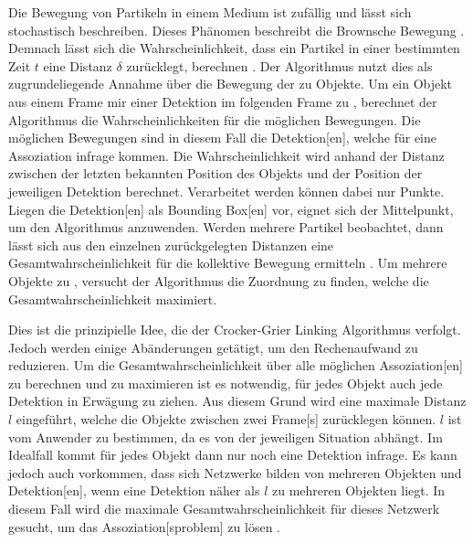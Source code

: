 Die Bewegung von Partikeln in einem Medium ist zufällig und lässt sich stochastisch beschreiben. Dieses Phänomen beschreibt die \gls{Brownsche Bewegung} \cite{Nelson.1972}. Demnach lässt sich die Wahrscheinlichkeit, dass ein Partikel in einer bestimmten Zeit \(t\) eine Distanz \(\delta\) zurücklegt, berechnen \cite{Crocker.1996}. Der Algorithmus nutzt dies als zugrundeliegende Annahme über die Bewegung der zu  Objekte. Um ein Objekt aus einem \gls{Frame} mir einer \gls{Detektion} im folgenden \gls{Frame} zu , berechnet der Algorithmus die Wahrscheinlichkeiten für die möglichen Bewegungen. Die möglichen Bewegungen sind in diesem Fall die \gls{Detektion}[en], welche für eine \gls{Assoziation} infrage kommen. Die Wahrscheinlichkeit wird anhand der Distanz zwischen der letzten bekannten Position des Objekts und der Position der jeweiligen \gls{Detektion} berechnet. Verarbeitet werden können dabei nur Punkte. Liegen die \gls{Detektion}[en] als \gls{Bounding Box}[en] vor, eignet sich der Mittelpunkt, um den Algorithmus anzuwenden. Werden mehrere Partikel beobachtet, dann lässt sich aus den einzelnen zurückgelegten Distanzen eine Gesamtwahrscheinlichkeit für die kollektive Bewegung ermitteln \cite{Crocker.1996}. Um mehrere Objekte zu , versucht der Algorithmus die Zuordnung zu finden, welche die Gesamtwahrscheinlichkeit maximiert. \par

Dies ist die prinzipielle Idee, die der Crocker-Grier Linking Algorithmus verfolgt. Jedoch werden einige Abänderungen getätigt, um den Rechenaufwand zu reduzieren. Um die Gesamtwahrscheinlichkeit über alle möglichen \gls{Assoziation}[en] zu berechnen und zu maximieren ist es notwendig, für jedes Objekt auch jede \gls{Detektion} in Erwägung zu ziehen. Aus diesem Grund wird eine maximale Distanz \(l\) eingeführt, welche die Objekte zwischen zwei \gls{Frame}[s] zurücklegen können. \(l\) ist vom Anwender zu bestimmen, da es von der jeweiligen Situation abhängt. Im Idealfall kommt für jedes Objekt dann nur noch eine \gls{Detektion} infrage. Es kann jedoch auch vorkommen, dass sich Netzwerke bilden von mehreren Objekten und \gls{Detektion}[en], wenn eine \gls{Detektion} näher als \(l\) zu mehreren Objekten liegt. In diesem Fall wird die maximale Gesamtwahrscheinlichkeit für dieses Netzwerk gesucht, um das \gls{Assoziation}[sproblem] zu lösen \cite{Crocker.1996}. \par

